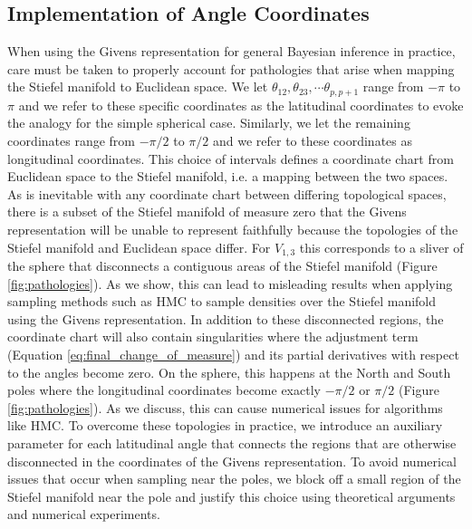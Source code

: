 \documentclass[ba]{imsart}
\numberwithin{equation}{section}
\theoremstyle{plain}
\begin{document}
\subsection{Implementation of Angle Coordinates}
When using the Givens representation for general Bayesian inference in practice, care must be taken to properly account for pathologies that arise when mapping the Stiefel manifold to Euclidean space. We let $\theta_{12}, \theta_{23}, \cdots \theta_{p,p+1}$ range from $-\pi$ to $\pi$ and we refer to these specific coordinates as the latitudinal coordinates to evoke the analogy for the simple spherical case. Similarly, we let the remaining coordinates range from $-\pi/2$ to $\pi/2$ and we refer to these coordinates as longitudinal coordinates. This choice of intervals defines a coordinate chart from Euclidean space to the Stiefel manifold, i.e. a mapping between the two spaces. As is inevitable with any coordinate chart between differing topological spaces, there is a subset of the Stiefel manifold of measure zero that the Givens representation will be unable to represent faithfully because the topologies of the Stiefel manifold and Euclidean space differ. For $V_{1,3}$ this corresponds to a sliver of the sphere that disconnects a contiguous areas of the Stiefel manifold (Figure \ref{fig:pathologies}). As we show, this can lead to misleading results when applying sampling methods such as HMC to sample densities over the Stiefel manifold using the Givens representation. In addition to these disconnected regions, the coordinate chart will also contain singularities where the adjustment term (Equation \ref{eq:final_change_of_measure}) and its partial derivatives with respect to the angles become zero. On the sphere, this happens at the North and South poles where the longitudinal coordinates become exactly $-\pi/2$ or $\pi/2$ (Figure \ref{fig:pathologies}). As we discuss, this can cause numerical issues for algorithms like HMC. To overcome these topologies in practice, we introduce an auxiliary parameter for each latitudinal angle that connects the regions that are otherwise disconnected in the coordinates of the Givens representation. To avoid numerical issues that occur when sampling near the poles, we block off a small region of the Stiefel manifold near the pole and justify this choice using theoretical arguments and numerical experiments.
\end{document}
